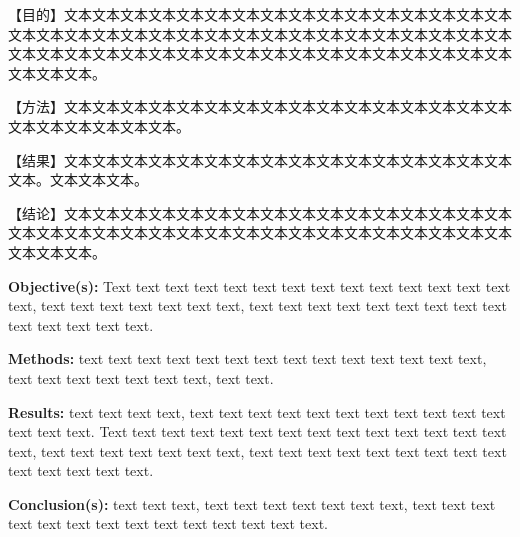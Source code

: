 \begin{cnabstract}
    【目的】文本文本文本文本文本文本文本文本文本文本文本文本文本文本文本文本文本文本文本文本文本文本文本文本文本文本文本文本文本文本文本文本文本文本文本文本文本文本文本文本文本文本文本文本文本文本文本文本文本文本文本文本文本文本文本。
    
    【方法】文本文本文本文本文本文本文本文本文本文本文本文本文本文本文本文本文本文本文本文本文本文本。
    
    【结果】文本文本文本文本文本文本文本文本文本文本文本文本文本文本文本文本文本。文本文本文本。
    
    【结论】文本文本文本文本文本文本文本文本文本文本文本文本文本文本文本文本文本文本文本文本文本文本文本文本文本文本文本文本文本文本文本文本文本文本文本文本文本。
    
\end{cnabstract}

\begin{enabstract}
    \textbf{Objective(s):} Text text text text text text text text text text text text text text text, text text text text text text text, text text text text text text text text text text text text text text.
    
    \textbf{Methods:} text text text text text text text text text text text text text text, text text text text text text text, text text.
    
    \textbf{Results:} text text text text, text text text text text text text text text text text text text text. Text text text text text text text text text text text text text text text, text text text text text text text, text text text text text text text text text text text text text text.
    
    \textbf{Conclusion(s):} text text text, text text text text text text text, text text text text text text text text text text text text text text.
    
\end{enabstract}
